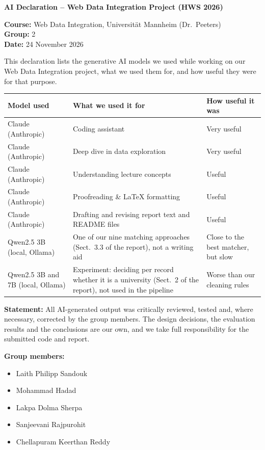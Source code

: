 \documentclass[11pt,a4paper]{article}
\begin{document}
{\LARGE\bfseries AI Declaration -- Web Data Integration Project (HWS 2026)\par}
\vspace{12pt}

\textbf{Course:} Web Data Integration, Universität Mannheim (Dr.~Peeters)\\
\textbf{Group:} 2\\
\textbf{Date:} 24 November 2026

This declaration lists the generative AI models we used while working on our
Web Data Integration project, what we used them for, and how useful they were
for that purpose.

\vspace{6pt}
\begin{table}[h]
\centering
\renewcommand{\arraystretch}{1.3}
\begin{tabularx}{\textwidth}{>{\raggedright\arraybackslash}p{4cm} >{\raggedright\arraybackslash}X >{\raggedright\arraybackslash}p{3.5cm}}
\toprule
\textbf{Model used} & \textbf{What we used it for} & \textbf{How useful it was} \\
\midrule
Claude (Anthropic) & Coding assistant & Very useful \\
Claude (Anthropic) & Deep dive in data exploration & Very useful \\
Claude (Anthropic) & Understanding lecture concepts & Useful \\
Claude (Anthropic) & Proofreading \& \LaTeX{} formatting & Useful \\
Claude (Anthropic) & Drafting and revising report text and README files & Useful \\
Qwen2.5 3B (local, Ollama) & One of our nine matching approaches (Sect.~3.3 of the report), not a writing aid & Close to the best matcher, but slow \\
Qwen2.5 3B and 7B (local, Ollama) & Experiment: deciding per record whether it is a university (Sect.~2 of the report), not used in the pipeline & Worse than our cleaning rules \\
\bottomrule
\end{tabularx}
\end{table}

\textbf{Statement:} All AI-generated output was critically reviewed, tested
and, where necessary, corrected by the group members. The design decisions,
the evaluation results and the conclusions are our own, and we take full
responsibility for the submitted code and report.

\textbf{Group members:}
\begin{itemize}
  \item Laith Philipp Sandouk
  \item Mohammad Hadad
  \item Lakpa Dolma Sherpa
  \item Sanjeevani Rajpurohit
  \item Chellapuram Keerthan Reddy
\end{itemize}
\end{document}
